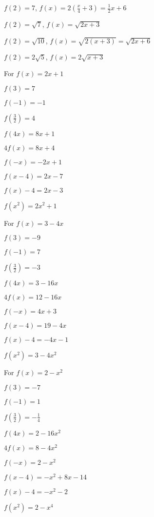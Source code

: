 \begin{tasks}
\task $f(2) = 7$, $f(x) = 2\left(\frac{x}{4} + 3\right) = \frac{1}{2} x + 6$   

\task $f(2) = \sqrt{7}$, $f(x) = \sqrt{2x+3}$ 

\task $f(2) = \sqrt{10}$, $f(x) = \sqrt{2(x+3)} = \sqrt{2x+6}$

\task $f(2) = 2 \sqrt{5}$, $f(x) = 2\sqrt{x+3}$ 

\task For $f(x) = 2x+1$ 

\begin{shortitemize}
\item $f(3) = 7$
\item $f(-1) = -1$
\item $f\left(\frac{3}{2} \right) = 4$
\item  $f(4x) = 8x+1$
\item $4f(x) = 8x+4$
\item $f(-x) = -2x+1$
\item  $f(x-4) = 2x-7$
\item $f(x) - 4 = 2x-3$
\item  $f\left(x^2\right) = 2x^2+1$
\end{shortitemize}

\task For $f(x) = 3-4x$ 

\begin{shortitemize}
\item $f(3) = -9$
\item $f(-1) = 7$
\item $f\left(\frac{3}{2} \right) = -3$
\item  $f(4x) = 3-16x$
\item $4f(x) = 12-16x$
\item $f(-x) = 4x+3$
\item  $f(x-4) = 19-4x$
\item $f(x) - 4 = -4x-1$
\item  $f\left(x^2\right) = 3-4x^2$
\end{shortitemize}

\task For $f(x) = 2 - x^2$ 

\begin{shortitemize}
\item $f(3) = -7$
\item $f(-1) = 1$
\item $f\left(\frac{3}{2} \right) = -\frac{1}{4}$
\item  $f(4x) = 2-16x^2$
\item $4f(x) = 8-4x^2$
\item $f(-x) = 2-x^2$
\item  $f(x-4) = -x^2+8x-14$
\item $f(x) - 4 = -x^{2} - 2$
\item  $f\left(x^2\right) = 2-x^4$
\end{shortitemize}


\end{tasks}
